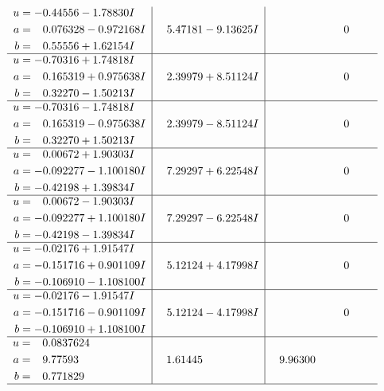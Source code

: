 \documentclass[1p]{elsarticle_modified}
\theoremstyle{definition}
\begin{document}
$$\begin{array}{c|c|c}
\begin{aligned}
u &= -0.44556 - 1.78830 I \\
a &= \phantom{-}0.076328 - 0.972168 I \\
b &= \phantom{-}0.55556 + 1.62154 I\end{aligned}
 & \phantom{-}5.47181 - 9.13625 I & \phantom{-0.000000 } 0 \\ \hline\begin{aligned}
u &= -0.70316 + 1.74818 I \\
a &= \phantom{-}0.165319 + 0.975638 I \\
b &= \phantom{-}0.32270 - 1.50213 I\end{aligned}
 & \phantom{-}2.39979 + 8.51124 I & \phantom{-0.000000 } 0 \\ \hline\begin{aligned}
u &= -0.70316 - 1.74818 I \\
a &= \phantom{-}0.165319 - 0.975638 I \\
b &= \phantom{-}0.32270 + 1.50213 I\end{aligned}
 & \phantom{-}2.39979 - 8.51124 I & \phantom{-0.000000 } 0 \\ \hline\begin{aligned}
u &= \phantom{-}0.00672 + 1.90303 I \\
a &= -0.092277 - 1.100180 I \\
b &= -0.42198 + 1.39834 I\end{aligned}
 & \phantom{-}7.29297 + 6.22548 I & \phantom{-0.000000 } 0 \\ \hline\begin{aligned}
u &= \phantom{-}0.00672 - 1.90303 I \\
a &= -0.092277 + 1.100180 I \\
b &= -0.42198 - 1.39834 I\end{aligned}
 & \phantom{-}7.29297 - 6.22548 I & \phantom{-0.000000 } 0 \\ \hline\begin{aligned}
u &= -0.02176 + 1.91547 I \\
a &= -0.151716 + 0.901109 I \\
b &= -0.106910 - 1.108100 I\end{aligned}
 & \phantom{-}5.12124 + 4.17998 I & \phantom{-0.000000 } 0 \\ \hline\begin{aligned}
u &= -0.02176 - 1.91547 I \\
a &= -0.151716 - 0.901109 I \\
b &= -0.106910 + 1.108100 I\end{aligned}
 & \phantom{-}5.12124 - 4.17998 I & \phantom{-0.000000 } 0 \\ \hline\begin{aligned}
u &= \phantom{-}0.0837624\phantom{ +0.000000I} \\
a &= \phantom{-}9.77593\phantom{ +0.000000I} \\
b &= \phantom{-}0.771829\phantom{ +0.000000I}\end{aligned}
 & \phantom{-}1.61445\phantom{ +0.000000I} & \phantom{-}9.96300\phantom{ +0.000000I}\\
 \hline 
 \end{array}$$\newpage\newpage\renewcommand{\arraystretch}{1}
\end{document}
